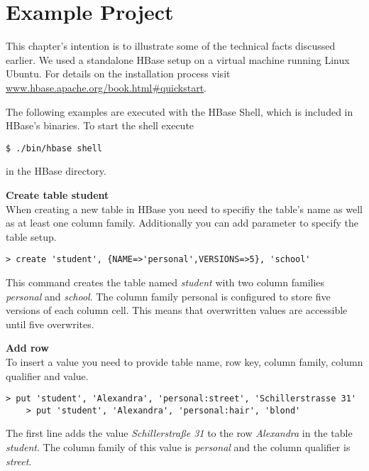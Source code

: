
\chapter{Example Project}
\label{lblHBaseExample}

This chapter's intention is to illustrate some of the technical facts discussed earlier. We used a standalone HBase setup on a virtual machine running Linux Ubuntu. For details on the installation process visit \href{www.hbase.apache.org/book.html\#quickstart}{www.hbase.apache.org/book.html\#quickstart}.

The following examples are executed with the HBase Shell, which is included in HBase's binaries. To start the shell execute 
\begin{lstlisting}[caption={start HBase shell},label=lst:hbas_shell]
	$ ./bin/hbase shell
\end{lstlisting}
in the HBase directory. 

\textbf{Create table student} \\
When creating a new table in HBase you need to specifiy the table's name as well as at least one column family. Additionally you can add parameter to specify the table setup. 
\begin{lstlisting}[caption={create table},label=lst:create_table]
	> create 'student', {NAME=>'personal',VERSIONS=>5}, 'school'
\end{lstlisting}
This command creates the table named \textit{student} with two column families \textit{personal} and \textit{school}. The column family personal is configured to store five versions of each column cell. This means that overwritten values are accessible until five overwrites. 

\textbf{Add row} \\
To insert a value you need to provide table name, row key, column family, column qualifier and value. 

\begin{lstlisting}[caption={insert values},label=lst:insert_values]
	> put 'student', 'Alexandra', 'personal:street', 'Schillerstrasse 31'
	> put 'student', 'Alexandra', 'personal:hair', 'blond'
\end{lstlisting}

The first line adds the value \textit{Schillerstraße 31} to the row \textit{Alexandra} in the table \textit{student}. The column family of this value is \textit{personal} and the column qualifier is \textit{street}. 

